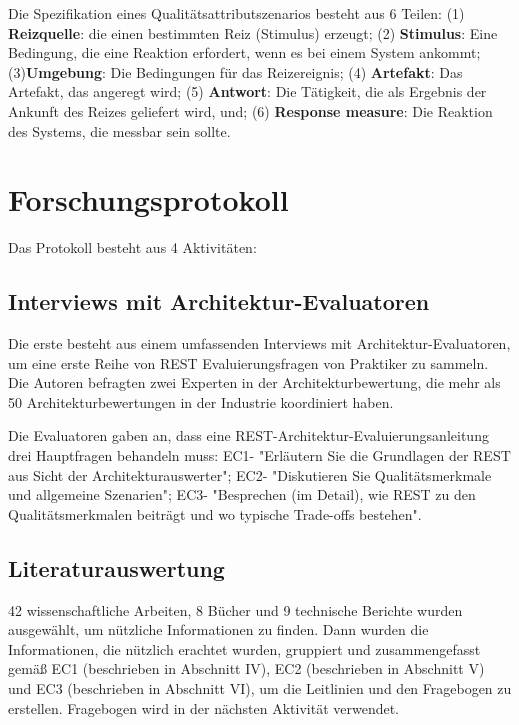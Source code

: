 \documentclass{acmsiggraph}
\begin{document}
Die Spezifikation eines Qualitätsattributszenarios besteht aus 6 Teilen: (1) \textbf{Reizquelle}: die einen bestimmten Reiz (Stimulus) erzeugt; (2) \textbf{Stimulus}: Eine Bedingung, die eine Reaktion erfordert, wenn es bei einem System ankommt; (3)\textbf{Umgebung}: Die Bedingungen für das Reizereignis; (4) \textbf{Artefakt}: Das Artefakt, das angeregt wird; (5) \textbf{Antwort}: Die Tätigkeit, die als Ergebnis der Ankunft des Reizes geliefert wird, und; (6) \textbf{Response measure}: Die Reaktion des Systems, die messbar sein sollte.

\section{Forschungsprotokoll}

Das Protokoll besteht aus 4 Aktivitäten:
\subsection{Interviews mit Architektur-Evaluatoren}
Die erste besteht aus einem umfassenden Interviews mit Architektur-Evaluatoren, um eine erste Reihe von REST Evaluierungsfragen von Praktiker zu sammeln.
Die Autoren befragten zwei Experten in der Architekturbewertung, die mehr als 50 Architekturbewertungen in der Industrie koordiniert haben.

Die Evaluatoren gaben an, dass eine REST-Architektur-Evaluierungsanleitung drei Hauptfragen behandeln muss:
EC1- "Erläutern Sie die Grundlagen der REST aus Sicht der Architekturauswerter";
EC2- "Diskutieren Sie Qualitätsmerkmale und allgemeine Szenarien";
EC3- "Besprechen (im Detail), wie REST zu den Qualitätsmerkmalen beiträgt und wo typische Trade-offs bestehen".
\subsection{Literaturauswertung}
42 wissenschaftliche Arbeiten, 8 Bücher und 9 technische Berichte wurden ausgewählt, um nützliche Informationen zu finden. Dann wurden die Informationen, die nützlich erachtet wurden, gruppiert und zusammengefasst gemäß EC1 (beschrieben in Abschnitt IV), EC2 (beschrieben in Abschnitt V) und EC3 (beschrieben in Abschnitt VI), um die Leitlinien und den Fragebogen zu erstellen. Fragebogen wird in der nächsten Aktivität verwendet.
\end{document}
